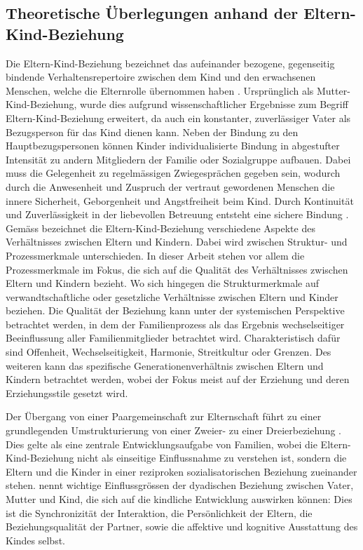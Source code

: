 \subsection{Theoretische Überlegungen anhand der Eltern-Kind-Beziehung}\label{sec:TheretischeÜberlegungen}
Die Eltern-Kind-Beziehung bezeichnet das aufeinander bezogene, gegenseitig bindende Verhaltensrepertoire zwischen dem Kind und den erwachsenen Menschen, welche die Elternrolle übernommen haben \cite{ElternKindBeziehung1999}. Ursprünglich als Mutter-Kind-Beziehung, wurde dies aufgrund wissenschaftlicher Ergebnisse zum Begriff Eltern-Kind-Beziehung erweitert, da auch ein konstanter, zuverlässiger Vater als Bezugsperson für das Kind dienen kann. Neben der Bindung zu den Hauptbezugspersonen können Kinder individualisierte Bindung in abgestufter Intensität zu andern Mitgliedern der Familie oder Sozialgruppe aufbauen. Dabei muss die Gelegenheit zu regelmässigen Zwiegesprächen gegeben sein, wodurch durch die Anwesenheit und Zuspruch der vertraut gewordenen Menschen die innere Sicherheit, Geborgenheit und Angstfreiheit beim Kind. Durch Kontinuität und Zuverlässigkeit in der liebevollen Betreuung entsteht eine sichere Bindung \cite{ElternKindBeziehung1999}. Gemäss  bezeichnet die Eltern-Kind-Beziehung verschiedene Aspekte des Verhältnisses zwischen Eltern und Kindern. Dabei wird zwischen Struktur- und Prozessmerkmale unterschieden. In dieser Arbeit stehen vor allem die Prozessmerkmale im Fokus, die sich auf die Qualität des Verhältnisses zwischen Eltern und Kindern bezieht. Wo sich hingegen die Strukturmerkmale auf verwandtschaftliche oder gesetzliche Verhältnisse zwischen Eltern und Kinder beziehen. Die Qualität der Beziehung kann unter der systemischen Perspektive betrachtet werden, in dem der Familienprozess als das Ergebnis wechselseitiger Beeinflussung aller Familienmitglieder betrachtet wird. Charakteristisch dafür sind Offenheit, Wechselseitigkeit, Harmonie, Streitkultur oder Grenzen. Des weiteren kann das spezifische Generationenverhältnis zwischen Eltern und Kindern betrachtet werden, wobei der Fokus meist auf der Erziehung und deren Erziehungsstile gesetzt wird. 

Der Übergang von einer Paargemeinschaft zur Elternschaft führt zu einer grundlegenden Umstrukturierung von einer Zweier- zu einer Dreierbeziehung \cite{Hofer1992, Buergin1998}. Dies gelte als eine zentrale Entwicklungsaufgabe von Familien, wobei die Eltern-Kind-Beziehung nicht als einseitige Einflussnahme zu verstehen ist, sondern die Eltern und die Kinder in einer reziproken sozialisatorischen Beziehung zueinander stehen.  nennt wichtige Einflussgrössen der dyadischen Beziehung zwischen Vater, Mutter und Kind, die sich auf die kindliche Entwicklung auswirken können: Dies ist die Synchronizität der Interaktion, die Persönlichkeit der Eltern, die Beziehungsqualität der Partner, sowie die affektive und kognitive Ausstattung des Kindes selbst. 

